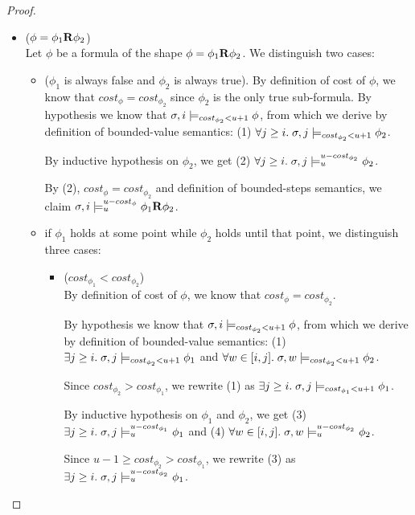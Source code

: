 \begin{theorem}
\begin{lemma}
\begin{proof}
\begin{itemize}
    \item ($\phi = \phi_1 \mathbf{R} \phi_2$) \\ 
    Let $\phi$ be a formula of the shape $\phi = \phi_1 \mathbf{R} \phi_2$.
    We distinguish two cases:
    \begin{itemize}
        \item ($\phi_1$ is always false and $\phi_2$ is always true).
        By definition of cost of $\phi$, we know that $cost_\phi = cost_{\phi_2}$ since $\phi_2$ is the only true sub-formula.
        By hypothesis we know that $\sigma, i \models_{cost_{\phi_2} < u + 1} \phi$, from which we derive by definition of bounded-value semantics: (1) $\forall j \geq i.\; \sigma,j \models_{cost_{\phi_2} < u + 1} \phi_2$.

        By inductive hypothesis on $\phi_2$, we get (2) $\forall j \geq i.\; \sigma,j \models_{u}^{u-cost_{\phi_2}} \phi_2$.

        By (2), $cost_\phi = cost_{\phi_2}$ and definition of bounded-steps semantics, we claim $\sigma,i \models_{u}^{u-cost_\phi} \phi_1 \mathbf{R} \phi_2$.

        \item if $\phi_1$ holds at some point while $\phi_2$ holds until that point, we distinguish three cases:
        \begin{itemize}
            \item ($cost_{\phi_1} < cost_{\phi_2}$) \\
            By definition of cost of $\phi$, we know that $cost_\phi = cost_{\phi_2}$.

            By hypothesis we know that $\sigma, i \models_{cost_{\phi_2} < u + 1} \phi$, from which we derive by definition of bounded-value semantics: (1) $\exists j \geq i.\; \sigma,j \models_{cost_{\phi_2} < u + 1} \phi_1$ and $\forall w \in [i,j].\; \sigma,w \models_{cost_{\phi_2} < u + 1} \phi_2$.

            Since $cost_{\phi_2} > cost_{\phi_1}$, we rewrite (1) as $\exists j \geq i.\; \sigma,j \models_{cost_{\phi_1} < u + 1} \phi_1$. 

            By inductive hypothesis on $\phi_1$ and $\phi_2$, we get (3) $\exists j \geq i.\; \sigma,j \models_{u}^{u-cost_{\phi_1}} \phi_1$ and (4) $\forall w \in [i,j].\; \sigma,w \models_{u}^{u-cost_{\phi_2}} \phi_2$.

            Since $u-1 \geq cost_{\phi_2} > cost_{\phi_1}$, we rewrite (3) as $\exists j \geq i.\; \sigma,j \models_{u}^{u-cost_{\phi_2}} \phi_1$.


\end{itemize}
\end{itemize}
\end{itemize}
\end{proof}
\end{lemma}
\end{theorem}
